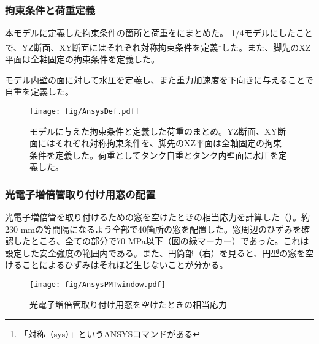 \subsubsection{拘束条件と荷重定義}


本モデルに定義した拘束条件の箇所と荷重をにまとめた。
1/4モデルにしたことで、YZ断面、XY断面にはそれぞれ対称拘束条件を定義\footnote{「対称（sys）」というANSYSコマンドがある}した。また、脚先のXZ平面は全軸固定の拘束条件を定義した。

モデル内壁の面に対して水圧を定義し、また重力加速度を下向きに与えることで自重を定義した。

\begin{figure}[h]
\centering
\texttt{[image: fig/AnsysDef.pdf]}
\caption[拘束条件と荷重定義]{モデルに与えた拘束条件と定義した荷重のまとめ。YZ断面、XY断面にはそれぞれ対称拘束条件を、脚先のXZ平面は全軸固定の拘束条件を定義した。荷重としてタンク自重とタンク内壁面に水圧を定義した。}
\label{AnsysDef}
\end{figure}




\subsubsection{光電子増倍管取り付け用窓の配置}
光電子増倍管を取り付けるための窓を空けたときの相当応力を計算した（）。約230 mmの等間隔になるよう全部で40箇所の窓を配置した。窓周辺のひずみを確認したところ、全ての部分で70 MPa以下（図の緑マーカー）であった。これは設定した安全強度の範囲内である。また、円筒部（右）を見ると、円型の窓を空けることによるひずみはそれほど生じないことが分かる。

\begin{figure}[htbp]
\centering
\texttt{[image: fig/AnsysPMTwindow.pdf]}
\caption[光電子増倍管取り付け用窓を空けたときの相当応力]{光電子増倍管取り付け用窓を空けたときの相当応力}
\label{AnsysPMTwindow}
\end{figure}


